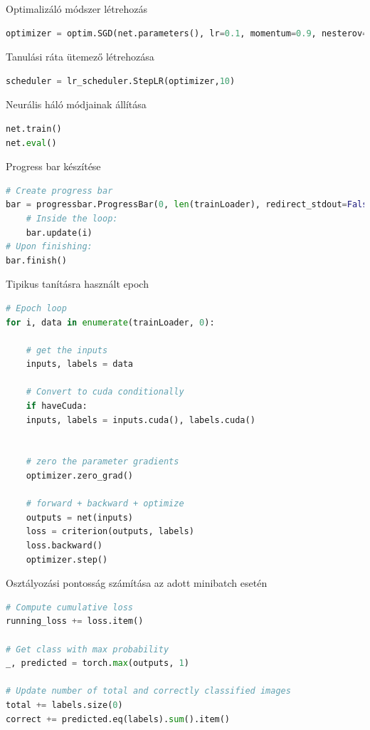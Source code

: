 \documentclass[12pt,a4paper,oneside]{report}             %
\begin{document}
Optimalizáló módszer létrehozás

\begin{lstlisting}[language=Python]
optimizer = optim.SGD(net.parameters(), lr=0.1, momentum=0.9, nesterov=True, weight_decay=1e-4)
\end{lstlisting}

Tanulási ráta ütemező létrehozása

\begin{lstlisting}[language=Python]
scheduler = lr_scheduler.StepLR(optimizer,10)
\end{lstlisting}

Neurális háló módjainak állítása

\begin{lstlisting}[language=Python]
net.train()
net.eval()
\end{lstlisting}

Progress bar készítése

\begin{lstlisting}[language=Python]
# Create progress bar
bar = progressbar.ProgressBar(0, len(trainLoader), redirect_stdout=False)
	# Inside the loop:
	bar.update(i)
# Upon finishing:
bar.finish()
\end{lstlisting}

Tipikus tanításra használt epoch

\begin{lstlisting}[language=Python]
# Epoch loop
for i, data in enumerate(trainLoader, 0):

	# get the inputs
	inputs, labels = data
	
	# Convert to cuda conditionally
	if haveCuda:
	inputs, labels = inputs.cuda(), labels.cuda()
	
	
	# zero the parameter gradients
	optimizer.zero_grad()
	
	# forward + backward + optimize
	outputs = net(inputs)
	loss = criterion(outputs, labels)
	loss.backward()
	optimizer.step()
\end{lstlisting}

Osztályozási pontosság számítása az adott minibatch esetén

\begin{lstlisting}[language=Python]
# Compute cumulative loss
running_loss += loss.item()

# Get class with max probability
_, predicted = torch.max(outputs, 1)

# Update number of total and correctly classified images
total += labels.size(0)
correct += predicted.eq(labels).sum().item()
\end{lstlisting}
\end{document}
